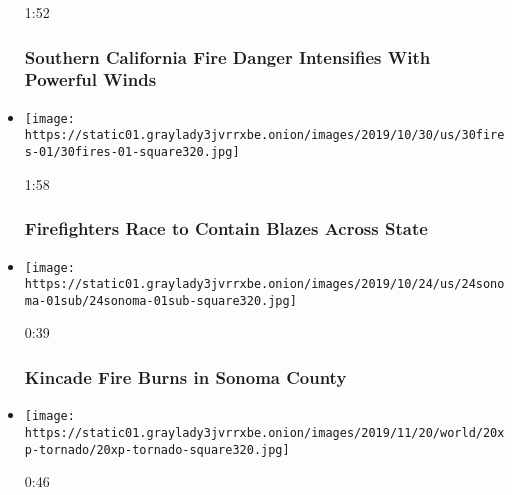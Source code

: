 \begin{itemize}
  1:52

  \hypertarget{southern-california-fire-danger-intensifies-with-powerful-winds}{%
  \subsubsection{Southern California Fire Danger Intensifies With
  Powerful
  Winds}\label{southern-california-fire-danger-intensifies-with-powerful-winds}}
\item
  \href{https://www.nytimes3xbfgragh.onion/video/us/100000006792866/wildfires-california.html?action=click\&module=video-series-bar\&region=header\&pgtype=Article\&playlistId=video/extreme-weather}{}

  \texttt{[image: https://static01.graylady3jvrrxbe.onion/images/2019/10/30/us/30fires-01/30fires-01-square320.jpg]}

  1:58

  \hypertarget{firefighters-race-to-contain-blazes-across-state}{%
  \subsubsection{Firefighters Race to Contain Blazes Across
  State}\label{firefighters-race-to-contain-blazes-across-state}}
\item
  \href{https://www.nytimes3xbfgragh.onion/video/us/100000006786878/kincade-fire-california.html?action=click\&module=video-series-bar\&region=header\&pgtype=Article\&playlistId=video/extreme-weather}{}

  \texttt{[image: https://static01.graylady3jvrrxbe.onion/images/2019/10/24/us/24sonoma-01sub/24sonoma-01sub-square320.jpg]}

  0:39

  \hypertarget{kincade-fire-burns-in-sonoma-county}{%
  \subsubsection{Kincade Fire Burns in Sonoma
  County}\label{kincade-fire-burns-in-sonoma-county}}
\item
  \href{https://www.nytimes3xbfgragh.onion/video/us/100000006779675/tornado-dallas.html?action=click\&module=video-series-bar\&region=header\&pgtype=Article\&playlistId=video/extreme-weather}{}

  \texttt{[image: https://static01.graylady3jvrrxbe.onion/images/2019/11/20/world/20xp-tornado/20xp-tornado-square320.jpg]}

  0:46


\end{itemize}
